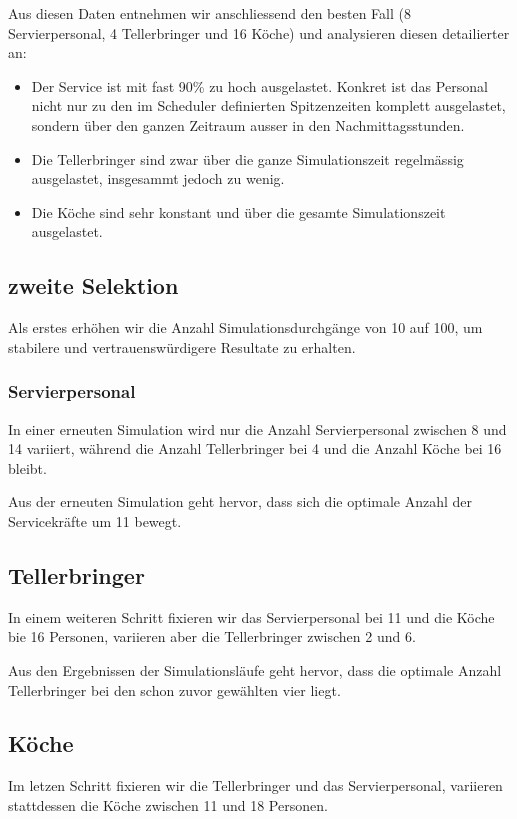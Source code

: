 \documentclass[ngerman,a4paper,12pt]{scrreprt}
\begin{document}
			Aus diesen Daten entnehmen wir anschliessend den besten Fall (8 Servierpersonal, 4 Tellerbringer und 16 Köche) und analysieren diesen detailierter an:
		
			\begin{itemize}
				\item Der Service ist mit fast 90\% zu hoch ausgelastet. Konkret ist das Personal nicht nur zu den im Scheduler definierten Spitzenzeiten komplett ausgelastet, sondern über den ganzen Zeitraum ausser in den Nachmittagsstunden. 				\item Die Tellerbringer sind zwar über die ganze Simulationszeit regelmässig ausgelastet, insgesammt jedoch zu wenig.
				\item Die Köche sind sehr konstant und über die gesamte Simulationszeit ausgelastet.
			\end{itemize}
			
			
		\subsection{zweite Selektion}
			Als erstes erhöhen wir die Anzahl Simulationsdurchgänge von 10 auf 100, um stabilere und vertrauenswürdigere Resultate zu erhalten.
			
			\subsubsection{Servierpersonal}
				In einer erneuten Simulation wird nur die Anzahl Servierpersonal zwischen 8 und 14 variiert, während die Anzahl Tellerbringer bei 4 und die Anzahl Köche bei 16 bleibt.
				
				Aus der erneuten Simulation geht hervor, dass sich die optimale Anzahl der Servicekräfte um 11 bewegt.
				
			\subsection{Tellerbringer}
				In einem weiteren Schritt fixieren wir das Servierpersonal bei 11 und die Köche bie 16 Personen, variieren aber die Tellerbringer zwischen 2 und 6.
				
				Aus den Ergebnissen der Simulationsläufe geht hervor, dass die optimale Anzahl Tellerbringer bei den schon zuvor gewählten vier liegt.

			\subsection{Köche}
				Im letzen Schritt fixieren wir die Tellerbringer und das Servierpersonal, variieren stattdessen die Köche zwischen 11 und 18 Personen.
				
\end{document}

